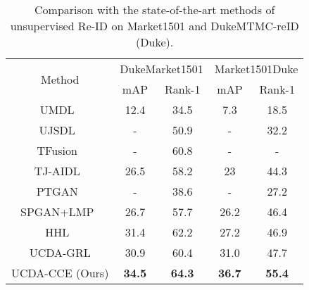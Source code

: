 \documentclass[10pt,twocolumn,letterpaper]{article}
\begin{document}
\renewcommand{\cmidrulesep}{0mm} 
\setlength{\aboverulesep}{0mm} 
\setlength{\belowrulesep}{0mm} 
\setlength{\abovetopsep}{0cm} 
\setlength{\belowbottomsep}{0cm}
\begin{table}[htbp]
 \centering
 \caption{Comparison with the state-of-the-art methods of unsupervised Re-ID on Market1501 and DukeMTMC-reID (Duke). }
 \begin{adjustbox}{width=0.45\textwidth}
   \begin{tabular}{|c|cc|cc|}
   \toprule
   \multirow{2}[2]{*}{Method} & \multicolumn{2}{c|}{DukeMarket1501} & \multicolumn{2}{c|}{Market1501Duke} \\
\cmidrule{2-5}         & mAP  & Rank-1 & mAP  & Rank-1 \\
   \midrule
   UMDL~\cite{DBLP:conf/cvpr/PengXWPGHT16} & 12.4 & 34.5 & 7.3  & 18.5 \\
   UJSDL~\cite{qi2018unsupervised} & - & 50.9 & -     & 32.2 \\
   \midrule
   TFusion~\cite{lv2018unsupervised}  & - & 60.8 & -     & - \\
   TJ-AIDL~\cite{wang2018transferable} & 26.5 & 58.2 & 23   & 44.3 \\
   \midrule
   PTGAN~\cite{wei2018person} & -     & 38.6 & -     & 27.2 \\
   SPGAN+LMP~\cite{deng2018image} & 26.7 & 57.7 & 26.2 & 46.4 \\
   HHL~\cite{zhong2018generalizing}  & 31.4 & 62.2 & 27.2 & 46.9 \\
   \midrule
    UCDA-GRL & 30.9 & 60.4 & 31.0 & 47.7 \\
   UCDA-CCE (Ours) & \textcolor[rgb]{ 1, 0, 0}{\textbf{34.5}} & \textcolor[rgb]{ 1, 0, 0}{\textbf{64.3}} & \textcolor[rgb]{ 1, 0, 0}{\textbf{36.7}} & \textcolor[rgb]{ 1, 0, 0}{\textbf{55.4}} \\
   \bottomrule
   \end{tabular}\end{adjustbox}
 \label{tab04}\vspace*{-5pt}
\end{table}
\end{document}
